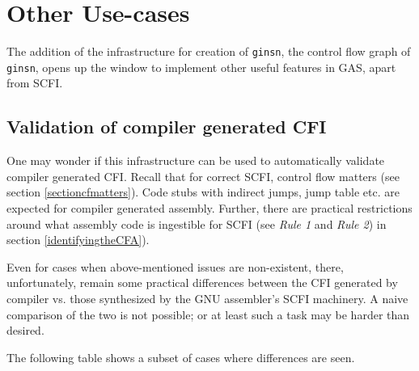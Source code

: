 \documentclass{article} \usepackage[a4paper, total={6in, 8in}]{geometry}
\begin{document}
\section{Other Use-cases}
The addition of the infrastructure for creation of \texttt{ginsn}, the control
flow graph of \texttt{ginsn}, opens up the window to implement other useful
features in GAS, apart from SCFI.

\subsection{Validation of compiler generated CFI}
One may wonder if this infrastructure can be used to automatically validate
compiler generated CFI.  Recall that for correct SCFI, control flow
matters (see section \ref{sectioncfmatters}).  Code stubs with indirect jumps,
jump table etc. are expected for compiler generated assembly.  Further,
there are practical restrictions around what assembly code is
ingestible for SCFI (see \emph{Rule 1} and \emph{Rule 2}) in section
\ref{identifyingtheCFA}).

Even for cases when above-mentioned issues are non-existent, there,
unfortunately, remain some practical differences between the CFI
generated by compiler vs. those synthesized by the GNU assembler's SCFI
machinery.  A naive comparison of the two is not possible; or at least such a
task may be harder than desired.

The following table shows a subset of cases where differences are seen.
\end{document}
